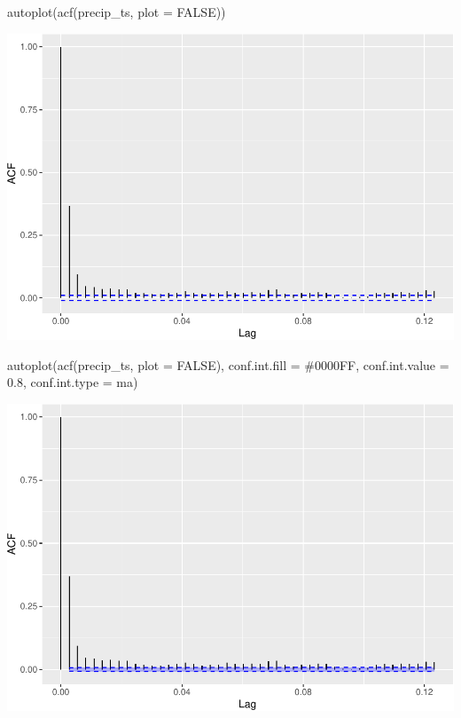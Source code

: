 \documentclass[
  paper=a4,
  ,captions=tableheading
]{scrartcl}
\newenvironment{Shaded}{\begin{snugshade}}{\end{snugshade}}
\newcommand{\AttributeTok}[1]{\textcolor[rgb]{0.77,0.63,0.00}{#1}}
\newcommand{\ConstantTok}[1]{\textcolor[rgb]{0.00,0.00,0.00}{#1}}
\newcommand{\FloatTok}[1]{\textcolor[rgb]{0.00,0.00,0.81}{#1}}
\newcommand{\FunctionTok}[1]{\textcolor[rgb]{0.00,0.00,0.00}{#1}}
\newcommand{\NormalTok}[1]{#1}
\newcommand{\StringTok}[1]{\textcolor[rgb]{0.31,0.60,0.02}{#1}}
\begin{document}
\begin{Shaded}
\begin{Highlighting}[]
\FunctionTok{autoplot}\NormalTok{(}\FunctionTok{acf}\NormalTok{(precip\_ts, }\AttributeTok{plot =} \ConstantTok{FALSE}\NormalTok{))}
\end{Highlighting}
\end{Shaded}

\includegraphics{Haskell_files/figure-latex/unnamed-chunk-85-1.pdf}

\begin{Shaded}
\begin{Highlighting}[]
\FunctionTok{autoplot}\NormalTok{(}\FunctionTok{acf}\NormalTok{(precip\_ts, }\AttributeTok{plot =} \ConstantTok{FALSE}\NormalTok{), }\AttributeTok{conf.int.fill =} \StringTok{\textquotesingle{}\#0000FF\textquotesingle{}}\NormalTok{, }\AttributeTok{conf.int.value =} \FloatTok{0.8}\NormalTok{, }\AttributeTok{conf.int.type =} \StringTok{\textquotesingle{}ma\textquotesingle{}}\NormalTok{)}
\end{Highlighting}
\end{Shaded}

\includegraphics{Haskell_files/figure-latex/unnamed-chunk-86-1.pdf}
\end{document}
